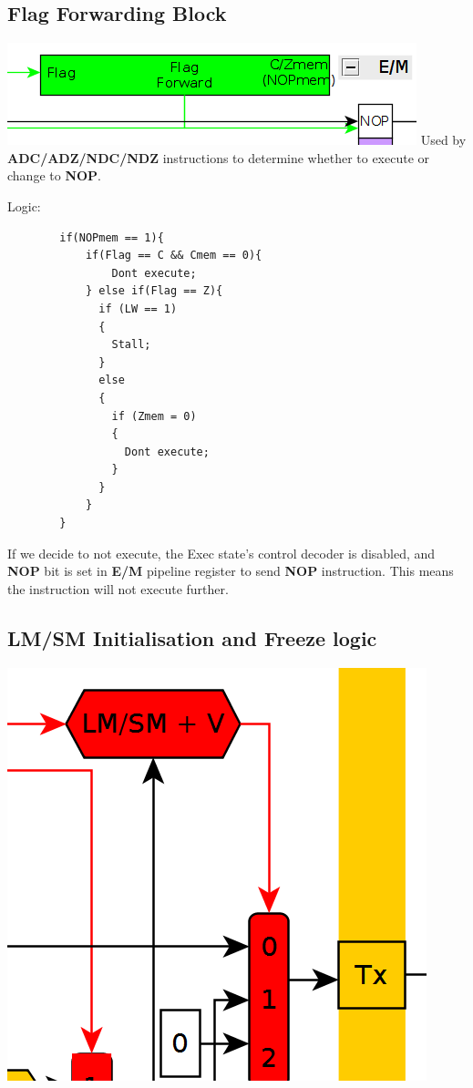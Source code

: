 \documentclass{article}
\begin{document}
\subsection*{Flag Forwarding Block}

\includegraphics{flag_forward}
Used by \textbf{ADC/ADZ/NDC/NDZ} instructions to determine whether to execute
or change to \textbf{NOP}.

Logic:
    \begin{lstlisting}
        if(NOPmem == 1){
            if(Flag == C && Cmem == 0){
                Dont execute;
            } else if(Flag == Z){
              if (LW == 1)
              {
                Stall;
              }
              else
              {
                if (Zmem = 0)
                {
                  Dont execute;
                } 
              }
            }
        }
    \end{lstlisting}

If we decide to not execute, the Exec state's control decoder is disabled, and
\textbf{NOP} bit is set in \textbf{E/M} pipeline register to send \textbf{NOP}
instruction. This means the instruction will not execute further.

\pagebreak
\subsection*{LM/SM Initialisation and Freeze logic}

\includegraphics[scale=0.7]{lm_sm_init}
\end{document}
